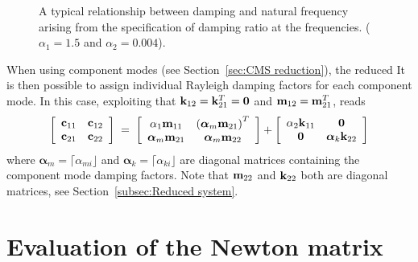\begin{figure}[b]

\caption{A typical relationship between damping and natural frequency arising
from the specification of damping ratio at the frequencies.
($\alpha_1=1.5$ and $\alpha_2 = 0.004$).}
\label{fig:RayleighDamping}
\end{figure}

When using component modes (see Section~\ref{sec:CMS reduction}), the reduced
\iftoggle{publicedition}{%
superelement matrices are partitioned into sub-matrices associated with
the retained nodal DOFs and component modes, respectively.
}{%
superelement mass- and stiffness matrices are partitioned
as given by \eqsref{eqCMS:Msubs}{eqCMS:Ksubs}, respectively.
} %
It is then possible to assign individual Rayleigh damping factors for each
component mode.
In this case, exploiting that ${\bf k}_{12} = {\bf k}_{21}^T = {\bf 0}$
and ${\bf m}_{12} = {\bf m}_{21}^T$,  reads
%
\begin{equation}
\left[\begin{array}{cc}
{\bf c}_{11} & {\bf c}_{12} \\
{\bf c}_{21} & {\bf c}_{22}
\end{array}\right] \;=\;
\left[\begin{array}{cc}
\alpha_1 {\bf m}_{11} & \left( {\mbox{\boldmath $\alpha$}}_m {\bf m}_{21} \right)^T \\
{\mbox{\boldmath $\alpha$}}_m {\bf m}_{21} & {\mbox{\boldmath $\alpha$}}_m {\bf m}_{22}
\end{array}\right] +
\left[\begin{array}{cc}
\alpha_2 {\bf k}_{11} & {\bf 0} \\
{\bf 0} & {\mbox{\boldmath $\alpha$}}_k {\bf k}_{22}
\end{array}\right]
\end{equation}
%
where ${\bm\alpha}_m = \lceil\alpha_{mi}\rfloor$
and ${\bm\alpha}_k = \lceil\alpha_{ki}\rfloor$
are diagonal matrices containing the component mode damping factors.
Note that ${\bf m}_{22}$ and ${\bf k}_{22}$ both are diagonal matrices,
see Section~\ref{subsec:Reduced system}.

\section{Evaluation of the Newton matrix}
\label{s:Evaluation of the Newton matrix}

